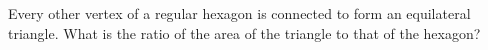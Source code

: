 Every other vertex of a regular hexagon is connected to form an equilateral triangle. What is the ratio of the area of the triangle to that of the hexagon?
